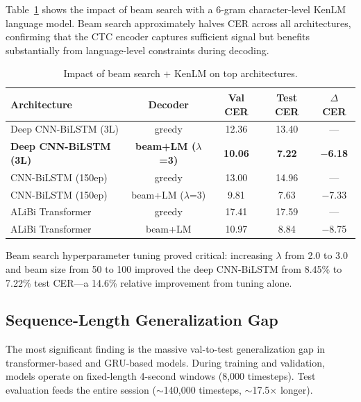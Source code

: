 \documentclass{article}
\begin{document}
Table~\ref{tab:beam} shows the impact of beam search with a 6-gram character-level KenLM language model. Beam search approximately halves CER across all architectures, confirming that the CTC encoder captures sufficient signal but benefits substantially from language-level constraints during decoding.

\begin{table}[h]
\centering
\small
\caption{Impact of beam search + KenLM on top architectures.}
\label{tab:beam}
\begin{tabular}{lcccc}
\toprule
\textbf{Architecture} & \textbf{Decoder} & \textbf{Val CER} & \textbf{Test CER} & $\Delta$ \textbf{CER} \\
\midrule
Deep CNN-BiLSTM (3L) & greedy & 12.36 & 13.40 & --- \\
\textbf{Deep CNN-BiLSTM (3L)} & \textbf{beam+LM ($\lambda$=3)} & \textbf{10.06} & \textbf{7.22} & \textbf{$-$6.18} \\
\midrule
CNN-BiLSTM (150ep) & greedy & 13.00 & 14.96 & --- \\
CNN-BiLSTM (150ep) & beam+LM ($\lambda$=3) & 9.81 & 7.63 & $-$7.33 \\
\midrule
ALiBi Transformer & greedy & 17.41 & 17.59 & --- \\
ALiBi Transformer & beam+LM & 10.97 & 8.84 & $-$8.75 \\
\bottomrule
\end{tabular}
\end{table}

Beam search hyperparameter tuning proved critical: increasing $\lambda$ from 2.0 to 3.0 and beam size from 50 to 100 improved the deep CNN-BiLSTM from 8.45\% to 7.22\% test CER---a 14.6\% relative improvement from tuning alone.


\subsection{Sequence-Length Generalization Gap}

The most significant finding is the massive val-to-test generalization gap in transformer-based and GRU-based models. During training and validation, models operate on fixed-length 4-second windows (8{,}000 timesteps). Test evaluation feeds the entire session (${\sim}$140{,}000 timesteps, ${\sim}$17.5$\times$ longer).
\end{document}
